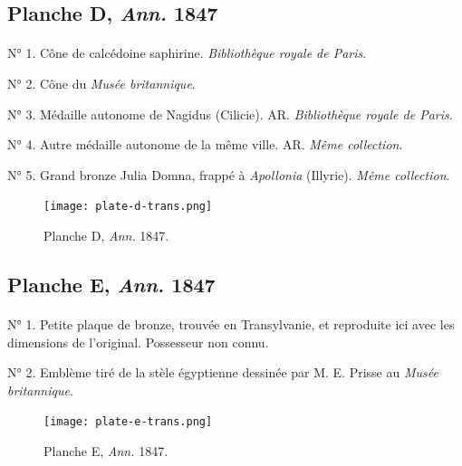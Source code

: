 \documentclass[a4paper, 11pt, oneside, polutonikogreek, french]{article}
\begin{document}
\subsection{Planche D, \emph{Ann.} 1847}
\paragraph{}
N° 1. Cône de calcédoine saphirine. \emph{Bibliothèque royale de Paris}.

N° 2. Cône du \emph{Musée britannique}.

N° 3. Médaille autonome de Nagidus (Cilicie). AR. \emph{Bibliothèque royale de Paris}.

N° 4. Autre médaille autonome de la même ville. AR. \emph{Même collection}.

N° 5. Grand bronze Julia Domna, frappé à \emph{Apollonia} (Illyrie). \emph{Même collection}.
\vspace*{\fill}
\clearpage
\pagestyle{fancy}
\fancyhf{}
\cfoot{{\scriptsize\bfseries\thepage}}
\vspace*{\fill}
\begin{figure}[H]
\centering
\texttt{[image: plate-d-trans.png]}
\caption{\scriptsize Planche D, \emph{Ann.} 1847.}
\end{figure}
\vspace*{\fill}
\clearpage
\pagestyle{plain}
\cfoot{{\tiny\bfseries\thepage}}
\vspace*{\fill}
\subsection{Planche E, \emph{Ann.} 1847}
\paragraph{}
N° 1. Petite plaque de bronze, trouvée en Transylvanie, et reproduite ici avec les dimensions de l'original. Possesseur non connu.

N° 2. Emblème tiré de la stèle égyptienne dessinée par M. E. Prisse au \emph{Musée britannique}.
\vspace*{\fill}
\clearpage
\pagestyle{fancy}
\fancyhf{}
\cfoot{{\scriptsize\bfseries\thepage}}
\vspace*{\fill}
\begin{figure}[H]
\centering
\texttt{[image: plate-e-trans.png]}
\caption{\scriptsize Planche E, \emph{Ann.} 1847.}
\end{figure}
\vspace*{\fill}
\clearpage
\end{document}
